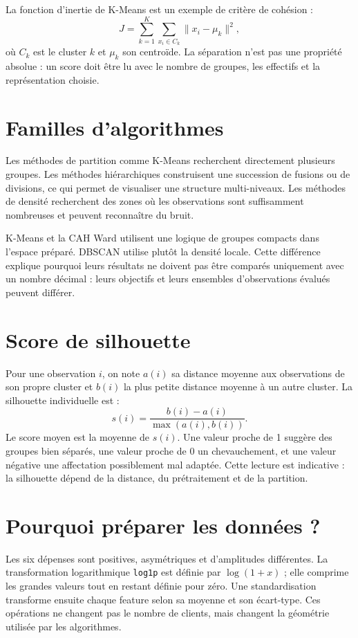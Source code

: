 La fonction d'inertie de K-Means est un exemple de critère de cohésion :
\begin{equation}
J=\sum_{k=1}^{K}\sum_{x_i\in C_k}\lVert x_i-\mu_k\rVert^2,
\end{equation}
où $C_k$ est le cluster $k$ et $\mu_k$ son centroïde. La séparation n'est pas une propriété absolue : un score doit être lu avec le nombre de groupes, les effectifs et la représentation choisie.

\section{Familles d'algorithmes}
Les méthodes de partition comme K-Means recherchent directement plusieurs groupes. Les méthodes hiérarchiques construisent une succession de fusions ou de divisions, ce qui permet de visualiser une structure multi-niveaux. Les méthodes de densité recherchent des zones où les observations sont suffisamment nombreuses et peuvent reconnaître du bruit.

K-Means et la CAH Ward utilisent une logique de groupes compacts dans l'espace préparé. DBSCAN utilise plutôt la densité locale. Cette différence explique pourquoi leurs résultats ne doivent pas être comparés uniquement avec un nombre décimal : leurs objectifs et leurs ensembles d'observations évalués peuvent différer.

\section{Score de silhouette}
Pour une observation $i$, on note $a(i)$ sa distance moyenne aux observations de son propre cluster et $b(i)$ la plus petite distance moyenne à un autre cluster. La silhouette individuelle est :
\begin{equation}
s(i)=\frac{b(i)-a(i)}{\max(a(i),b(i))}.
\end{equation}
Le score moyen est la moyenne de $s(i)$. Une valeur proche de 1 suggère des groupes bien séparés, une valeur proche de 0 un chevauchement, et une valeur négative une affectation possiblement mal adaptée. Cette lecture est indicative : la silhouette dépend de la distance, du prétraitement et de la partition.

\section{Pourquoi préparer les données ?}
Les six dépenses sont positives, asymétriques et d'amplitudes différentes. La transformation logarithmique \texttt{log1p} est définie par $\log(1+x)$ ; elle comprime les grandes valeurs tout en restant définie pour zéro. Une standardisation transforme ensuite chaque feature selon sa moyenne et son écart-type. Ces opérations ne changent pas le nombre de clients, mais changent la géométrie utilisée par les algorithmes.
